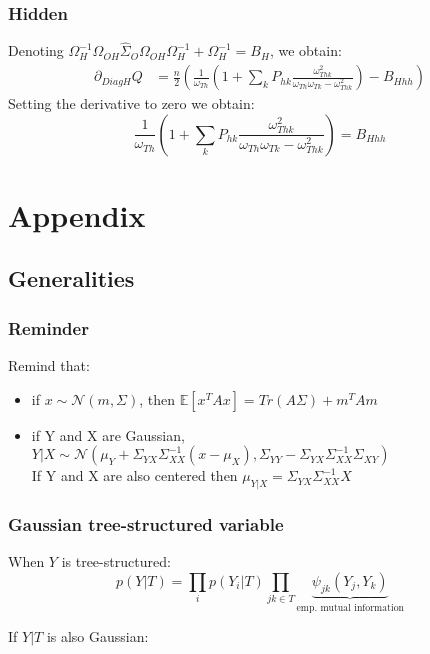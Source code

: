 \documentclass[11pt,a4paper]{article}
\newcommand{\Esp}{\mathds{E}}
\begin{document}
\subsubsection{Hidden}
Denoting $\Omega_{H}^{-1}\Omega_{OH}\widehat{\Sigma}_O\Omega_{OH}\Omega_{H}^{-1} + \Omega_{H}^{-1} = B_H $, we obtain:
\begin{align*}
\partial_{DiagH}Q &= \frac{n}{2}\left( \frac{1}{\omega_{Th}}\left( 1 + \sum_{k} P_{hk} \frac{\omega_{Thk} ^2}{\omega_{Th}\omega_{Tk} - \omega_{Thk} ^2}  \right) -B_{Hhh}\right)
\end{align*}
Setting the derivative to zero we obtain:
$$ \frac{1}{\omega_{Th}}\left( 1 + \sum_{k} P_{hk} \frac{\omega_{Thk} ^2}{\omega_{Th}\omega_{Tk} - \omega_{Thk} ^2}  \right) =B_{Hhh}  $$


\newpage
\section{Appendix}

\subsection{Generalities}


\subsubsection{Reminder}
Remind that:
\begin{itemize}
\item if $x\sim\mathcal{N}(m, \Sigma)$, then
$\Esp[x^TAx] = Tr(A\Sigma) + m^TAm$
\item if Y and X are Gaussian, $Y|X \sim \mathcal{N}(\mu_Y+\Sigma_{YX}\Sigma_{XX}^{-1}(x-\mu_X) , \Sigma_{YY} - \Sigma_{YX}\Sigma_{XX}^{-1}\Sigma_{XY})$\\
If Y and X are also centered then $\mu_{Y|X} = \Sigma_{YX}\Sigma_{XX}^{-1} X$
\end{itemize}


\subsubsection{Gaussian tree-structured variable}
When $Y$ is tree-structured:
$$ p(Y|T) = \prod_i  p(Y_i|T) \prod_{jk\in T} \underbrace{\psi_{jk}(Y_j,Y_k)}_{\text{emp. mutual  information}}$$

If $Y|T$ is also Gaussian:
\end{document}
